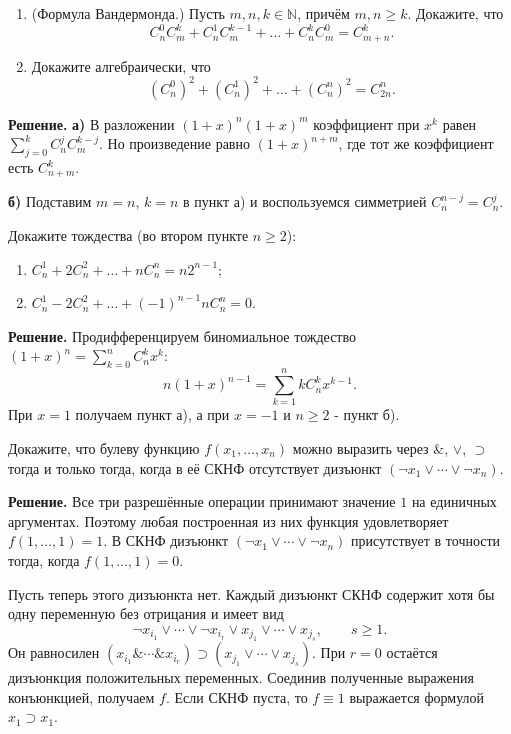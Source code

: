\begin{problems}
\item
\begin{enumerate}
  \item[а)] (Формула Вандермонда.) Пусть $m,n,k\in\mathbb N$, причём $m,n\geq k$. Докажите, что
  \[
    C_n^0C_m^k+C_n^1C_m^{k-1}+\dots+C_n^kC_m^0=C_{m+n}^k.
  \]
  \item[б)] Докажите алгебраически, что
  \[
    (C_n^0)^2+(C_n^1)^2+\dots+(C_n^n)^2=C_{2n}^n.
  \]
\end{enumerate}
\par\smallskip\noindent\textbf{Решение.} \textbf{а)} В разложении $(1+x)^n(1+x)^m$ коэффициент при $x^k$ равен $\sum_{j=0}^k C_n^jC_m^{k-j}$. Но произведение равно $(1+x)^{n+m}$, где тот же коэффициент есть $C_{n+m}^k$.
\par\textbf{б)} Подставим $m=n$, $k=n$ в пункт а) и воспользуемся симметрией $C_n^{n-j}=C_n^j$.\par

\item Докажите тождества (во втором пункте $n\geq2$):
\begin{enumerate}
  \item[а)] $C_n^1+2C_n^2+\dots+nC_n^n=n2^{n-1}$;
  \item[б)] $C_n^1-2C_n^2+\dots+(-1)^{n-1}nC_n^n=0$.
\end{enumerate}
\par\smallskip\noindent\textbf{Решение.} Продифференцируем биномиальное тождество $(1+x)^n=\sum_{k=0}^n C_n^k x^k$:
\[
n(1+x)^{n-1}=\sum_{k=1}^n kC_n^k x^{k-1}.
\]
При $x=1$ получаем пункт а), а при $x=-1$ и $n\ge2$ - пункт б).\par

\item Докажите, что булеву функцию $f(x_1,\ldots,x_n)$ можно выразить через $\mathbin{\&}$, $\vee$, $\supset$ тогда и только тогда, когда в её СКНФ отсутствует дизъюнкт $(\neg x_1\vee\cdots\vee\neg x_n)$.
\par\smallskip\noindent\textbf{Решение.} Все три разрешённые операции принимают значение $1$ на единичных аргументах. Поэтому любая построенная из них функция удовлетворяет $f(1,\ldots,1)=1$. В СКНФ дизъюнкт $(\neg x_1\vee\cdots\vee\neg x_n)$ присутствует в точности тогда, когда $f(1,\ldots,1)=0$.
\par Пусть теперь этого дизъюнкта нет. Каждый дизъюнкт СКНФ содержит хотя бы одну переменную без отрицания и имеет вид
\[
\neg x_{i_1}\vee\cdots\vee\neg x_{i_r}\vee x_{j_1}\vee\cdots\vee x_{j_s},\qquad s\ge1.
\]
Он равносилен $(x_{i_1}\mathbin{\&}\cdots\mathbin{\&}x_{i_r})\supset(x_{j_1}\vee\cdots\vee x_{j_s})$. При $r=0$ остаётся дизъюнкция положительных переменных. Соединив полученные выражения конъюнкцией, получаем $f$. Если СКНФ пуста, то $f\equiv1$ выражается формулой $x_1\supset x_1$.\par


\end{problems}
